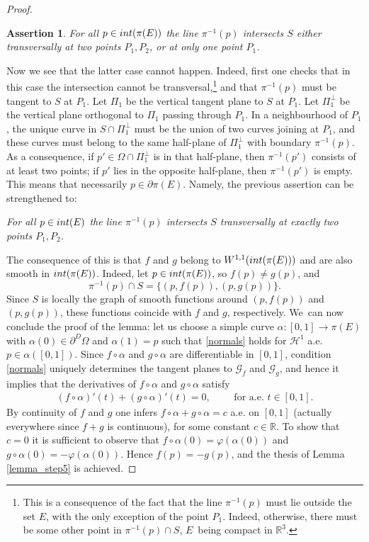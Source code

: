\documentclass[11pt]{article}
\numberwithin{equation}{section}
\newcommand{\R}{\mathbb{R}}
\let\Om\Omega
\newtheorem*{assertion*}{Assertion}
\theoremstyle{definition}
\begin{document}
\begin{proof}
\begin{assertion*}
For all $p\in\textup{int}(\pi(E))$ the line $\pi^{-1}(p)$
intersects $S$ either
transversally at two points $P_1,P_2$, or at only one point $P_1$.
\end{assertion*}

Now we see that the latter case cannot happen.
Indeed, first one checks
that in this case the intersection cannot be transversal,\footnote{This is a consequence of the fact that the line $\pi^{-1}(p)$ must lie outside the set $E$, with the only exception of the point $P_1$. Indeed, otherwise, there must be some other point in $\pi^{-1}(p)\cap S$, $E$~being compact in $\R^3$.} and that $\pi^{-1}(p)$ must be tangent to $S$ at $P_1$. Let $\Pi_1$ be the
vertical tangent plane to $S$ at $P_1$.
Let $\Pi_1^\perp$ be the vertical plane orthogonal to $\Pi_1$
passing
through $P_1$. In a neighbourhood of $P_1$, the unique curve in $S\cap \Pi_1^\perp$
must be the union of two curves joining at $P_1$, and these curves must belong to
the same half-plane of $\Pi_1^\perp$ with boundary $\pi^{-1}(p)$.
As a consequence, if $p'\in \Omega\cap \Pi_1^\perp$ is in
that half-plane, then $\pi^{-1}(p')$ consists of at least two points; if $p'$ lies in the opposite half-plane, then $\pi^{-1}(p')$ is empty. This means that necessarily $p\in \partial \pi(E)$. Namely, the previous assertion can be strengthened to:

\textit{For all $p\in\textup{int}(E)$ the line $\pi^{-1}(p)$ intersects $S$ transversally at exactly two points $P_1,P_2$.}

The consequence of this is that $f$ and $g$ belong to $W^{1,1}(\textup{int}(\pi(E)))$ and are also smooth in $\textup{int}(\pi(E))$.
Indeed, let $p\in \textup{int}(\pi(E))$, so $f(p)\neq g(p)$, and
\begin{equation}\label{twopoints}
\pi^{-1}(p)\cap S=\{(p,f(p)),(p,g(p))\}.
\end{equation}
Since $S$ is locally the graph of smooth functions around $(p,f(p))$ and $(p,g(p))$,
these functions coincide with $f$ and $g$, respectively. We~can now conclude the proof
of the lemma: let us choose a simple curve $\alpha:[0,1]\to \pi(E)$ with $\alpha(0)\in \partial^D\Om$ and $\alpha(1)=p$ such that \eqref{normals} holds for $\mathcal H^1$ a.e. $p\in \alpha([0,1])$. Since $f\circ \alpha$ and $g\circ \alpha$
are differentiable in $[0,1]$, condition
\eqref{normals} uniquely determines the tangent planes to $\mathcal G_f$ and $\mathcal G_g$, and hence it implies that the derivatives of $f\circ \alpha$ and $g\circ\alpha$ satisfy
\begin{align}
(f\circ \alpha)'(t)+(g\circ \alpha)'(t)=0,\qquad \text{ for a.e. }t\in[0,1].
\end{align}
By continuity of $f$ and $g$ one infers $f\circ\alpha+g\circ\alpha=c$ a.e. on $[0,1]$ (actually everywhere since $f+g$ is continuous), for some constant $c\in\R$. To show that $c=0$ it is sufficient to observe that $f\circ\alpha(0)=\varphi(\alpha(0))$ and $g\circ\alpha(0)=-\varphi(\alpha(0))$. Hence $f(p)=-g(p)$, and the thesis of Lemma \ref{lemma_step5} is achieved.
\end{proof}
\end{document}
